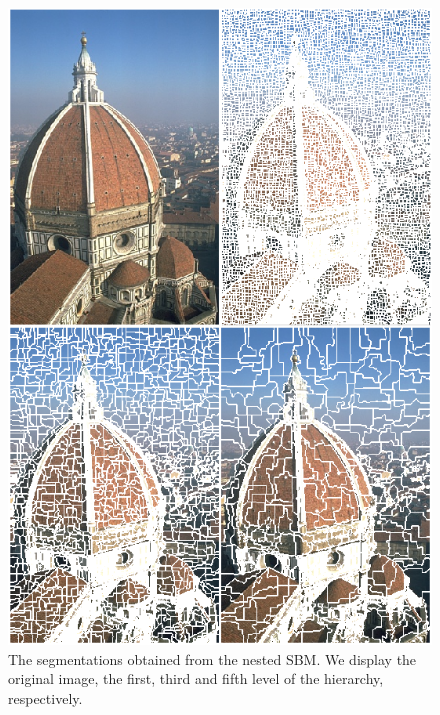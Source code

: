 \documentclass[conference]{IEEEtran}
\begin{document}
\begin{figure}[ht]
    \centering
    \includegraphics[width=\linewidth]{images/hsbm_florence_segmentation.png}
    \caption{The segmentations obtained from the nested SBM. We display the original image, the first, third and fifth level of the hierarchy, respectively.}
    \label{fig:sbm_hseg_firenze}
\end{figure}
\end{document}
